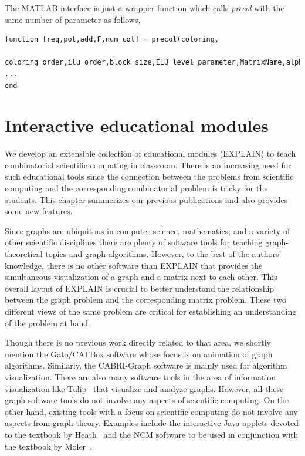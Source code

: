 \documentclass[12pt, twoside,a4paper,toc=bibliography]{scrbook}
\begin{document}
The MATLAB interface is just a wrapper function which calls \textit{precol} with
the same number of parameter as follows,
\begin{lstlisting}
function [req,pot,add,F,num_col] = precol(coloring,
	coloring_order,ilu_order,block_size,ILU_level_parameter,MatrixName,alpha)
...
end
\end{lstlisting}
\chapter{Interactive educational modules}
\label{explain}
We develop an extensible collection of educational modules (\mbox{EXPLAIN})
to teach combinatorial scientific computing in classroom.
There is an increasing need for such educational tools since the connection
between the problems from scientific computing and the corresponding combinatorial
problem is tricky for the students. This chapter summerizes our previous publications
\cite{2013:05,2014:01,2014:02,2014:09,2015:3} and also provides some new features.

Since graphs are ubiquitous in computer science, mathematics, and a variety of other scientific
disciplines there are plenty of software tools for teaching graph-theoretical topics and graph
algorithms. However, to the best of the authors' knowledge, there is no other software than EXPLAIN
that provides the simultaneous visualization of a graph and a matrix next to each other. This
overall layout of EXPLAIN is crucial to better understand the relationship between the graph
problem and the corresponding matrix problem. These two different views of the same problem are
critical for establishing an understanding of the problem at hand.

Though there is no previous work directly related to that area, we shortly mention the Gato/CATBox
\cite{gato2002} software whose focus is on animation of graph algorithms. Similarly, the
CABRI-Graph \cite{CABRI96} software is mainly used for algorithm visualization. There are also many
software tools in the area of information visualization like
Tulip~\cite{auber:tulip3,tulippython2012} that visualize and analyze graphs. However, all these
graph software tools do not involve any aspects of scientific computing. On the other hand,
existing tools with a focus on scientific computing do not involve any aspects from graph theory.
Examples include the interactive Java applets devoted to the textbook by Heath~\cite{MH96SCAIS} and
the NCM software to be used in conjunction with the textbook by Moler~\cite{mol:num}.
\end{document}
